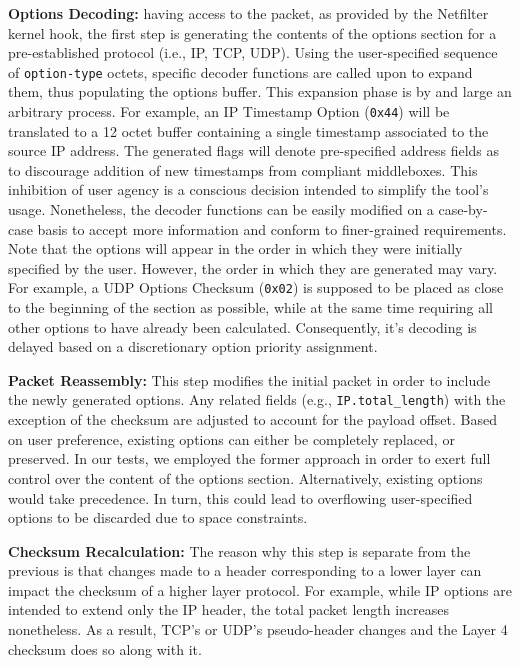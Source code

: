 \textbf{Options Decoding:} having access to the packet, as provided by the Netfilter kernel hook, the first step is generating the contents of the options section for a pre-established protocol (i.e., IP, TCP, UDP). Using the user-specified sequence of \texttt{option-type} octets, specific decoder functions are called upon to expand them, thus populating the options buffer. This expansion phase is by and large an arbitrary process. For example, an IP Timestamp Option (\texttt{0x44}) will be translated to a 12 octet buffer containing a single timestamp associated to the source IP address. The generated flags will denote pre-specified address fields as to discourage addition of new timestamps from compliant middleboxes. This inhibition of user agency is a conscious decision intended to simplify the tool's usage. Nonetheless, the decoder functions can be easily modified on a case-by-case basis to accept more information and conform to finer-grained requirements. Note that the options will appear in the order in which they were initially specified by the user. However, the order in which they are generated may vary. For example, a UDP Options Checksum (\texttt{0x02}) is supposed to be placed as close to the beginning of the section as possible, while at the same time requiring all other options to have already been calculated. Consequently, it's decoding is delayed based on a discretionary option priority assignment.

\textbf{Packet Reassembly:} This step modifies the initial packet in order to include the newly generated options. Any related fields (e.g., \texttt{IP.total\_length}) with the exception of the checksum are adjusted to account for the payload offset. Based on user preference, existing options can either be completely replaced, or preserved. In our tests, we employed the former approach in order to exert full control over the content of the options section. Alternatively, existing options would take precedence. In turn, this could lead to overflowing user-specified options to be discarded due to space constraints.

\textbf{Checksum Recalculation:} The reason why this step is separate from the previous is that changes made to a header corresponding to a lower layer can impact the checksum of a higher layer protocol. For example, while IP options are intended to extend only the IP header, the total packet length increases nonetheless. As a result, TCP's or UDP's pseudo-header changes and the Layer 4 checksum does so along with it.

